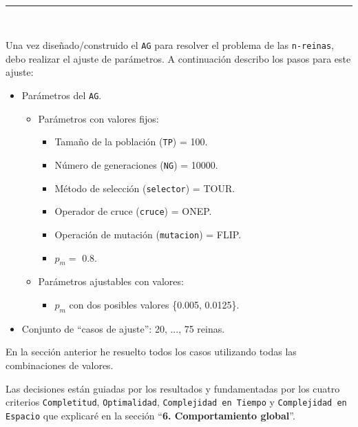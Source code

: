 
\newpage
\begin{center}
	{\fboxrule=4pt } \\
	\setcounter{chapter}{3}
	\setcounter{section}{0}
	\label{ch:prueba_ajuste}
	\rule{15cm}{0pt} \\
\end{center}

\par Una vez diseñado/construido el \texttt{AG} para resolver el problema de las \texttt{n-reinas}, 
debo realizar el ajuste de parámetros. A continuación describo los pasos para este ajuste:

\begin{itemize}
	\item Parámetros del \texttt{AG}.
	\begin{itemize}
		\item Parámetros con valores fijos:
		\begin{itemize}
			\item Tamaño de la población (\texttt{TP}) = 100.
			\item Número de generaciones (\texttt{NG}) = 10000.
			\item Método de selección (\texttt{selector}) = TOUR.
			\item Operador de cruce (\texttt{cruce}) = ONEP.
			\item Operación de mutación (\texttt{mutacion}) = FLIP.
			\item $p_m =$ 0.8.
		\end{itemize}
		\item Parámetros ajustables con valores:
		\begin{itemize}
			\item $p_m$ con dos posibles valores \{0.005, 0.0125\}.
		\end{itemize}
	\end{itemize}
	\item Conjunto de ``casos de ajuste'': 20, ..., 75 reinas.
\end{itemize}

\par En la sección anterior he resuelto todos los casos utilizando todas las combinaciones de valores.
\par Las decisiones están guiadas por los resultados y fundamentadas por los cuatro criterios
\texttt{Completitud}, \texttt{Optimalidad}, \texttt{Complejidad en Tiempo} y \texttt{Complejidad en Espacio} que explicaré en 
la sección ``\textbf{6. Comportamiento global}''. 

